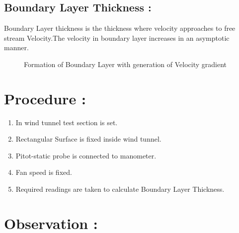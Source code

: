 \documentclass[12pt,a4paper]{article}
\begin{document}
\subsection{Boundary Layer Thickness :} Boundary Layer thickness is the thickness where velocity approaches to free stream Velocity.The velocity in boundary layer  increases in an asymptotic manner.




\begin{figure}[!ht]
	\begin{center}
	\end{center}
	\caption{Formation of Boundary Layer with generation of Velocity gradient}
\end{figure}





\section{Procedure :}
\begin{enumerate}
    \item In wind tunnel test section is set.
    \item Rectangular Surface is fixed inside wind tunnel.
    \item Pitot-static probe is connected to manometer.
    \item Fan speed is fixed.
    \item Required readings are taken to calculate Boundary Layer Thickness.
\end{enumerate}






\section{Observation :}
\end{document}
